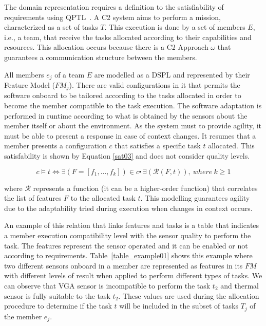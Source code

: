 The domain representation requires a definition to the satisfiability of requirements using QPTL~\cite{qptl01}. A C2 system aims to perform a mission, characterized as a set of tasks $T$. This execution is done by a set of members $E$, i.e., a team, that receive the tasks allocated according to their capabilities and resources. This allocation occurs because there is a C2 Approach $\omega$ that guarantees a communication structure between the members.

All members $e_j$ of a team $E$ are modelled as a DSPL and represented by their Feature Model ($FM_j$). There are valid configurations in it that permits the software onboard to be tailored according to the tasks allocated in order to become the member compatible to the task execution. The software adaptation is performed in runtime according to what is obtained by the sensors about the member itself or about the environment. As the system must to provide agility, it must be able to present a response in case of context changes. It resumes that a member presents a configuration $c$ that satisfies a specific task $t$ allocated. This satisfability is shown by Equation \ref{sat03} and does not consider quality levels.

\begin{center}
\begin{equation}
\label{sat03}
c \models t \Longleftrightarrow \exists (F=[f_1, ...,f_k]) \in c \centerdot \ \exists (\mathcal{R}(F, t)),\ where\ k \geq 1
\end{equation}
\end{center}

where $\mathcal{R}$ represents a function (it can be a higher-order function) that correlates the list of features $F$ to the allocated task $t$. This modelling guarantees agility due to the adaptability tried during execution when changes in context occurs.

An example of this relation that links features and tasks is a table that indicates a member execution compatibility level with the sensor quality to perform the task. The features represent the sensor operated and it can be enabled or not according to requirements. Table~\ref{table_example01} shows this example where two different sensors onboard in a member are represented as features in its $FM$ with different levels of result when applied to perform different types of tasks. We can observe that VGA sensor is incompatible to perform the task $t_2$ and thermal sensor is fully suitable to the task $t_2$. These values are used during the allocation procedure to determine if the task $t$ will be included in the subset of tasks $T_j$ of the member $e_j$.

